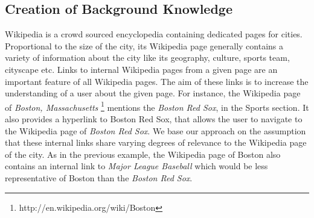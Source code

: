 \subsection{Creation of Background Knowledge}
Wikipedia is a crowd sourced encyclopedia containing dedicated pages for cities. Proportional to the size of the city, its Wikipedia page generally contains a variety of information about the city like its geography, culture, sports team, cityscape etc. Links to internal Wikipedia pages from a given page are an important feature of all Wikipedia pages. The aim of these links is to increase the understanding of a user about the given page. For instance, the Wikipedia page of \textit{Boston, Massachusetts} \footnote{http://en.wikipedia.org/wiki/Boston} mentions the \textit{Boston Red Sox}, in the Sports section. It also provides a hyperlink to Boston Red Sox, that allows the user to navigate to the Wikipedia page of \textit{Boston Red Sox}. We base our approach on the assumption that these internal links share varying degrees of relevance to the Wikipedia page of the city. As in the previous example, the Wikipedia page of Boston also contains an internal link to \textit{Major League Baseball} which would be less representative of Boston than the \textit{Boston Red Sox}. 




